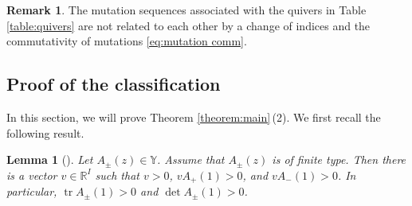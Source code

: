 \documentclass[pdftex]{sigma}
\numberwithin{equation}{section}
\newtheorem{Lemma}[Theorem]{Lemma}
\theoremstyle{definition}
\newtheorem{Remark}[Theorem]{Remark}
\DeclareMathOperator{\tr}{tr}
\begin{document}
\begin{Remark}\label{remark:quiver is different}
 The mutation sequences associated with the quivers in Table \ref{table:quivers}
 are not related to each other by
 a change of indices and the commutativity of mutations \eqref{eq:mutation comm}.
\end{Remark}

\subsection{Proof of the classification}
\label{section:proof of classification}
In this section, we will prove Theorem \ref{theorem:main}\,(2). We first recall the following result.
\begin{Lemma}[{\cite[Theorem 5.5]{mizuno2020difference}}]
 \label{lemma:simultaneous positive}
 Let $A_\pm(z) \in \mathbb{Y}$. Assume that $A_\pm(z)$ is of finite type.
 Then there is a vector $v \in \mathbb{R}^I$ such that $v > 0$,
 $v A_+(1) > 0$, and $v A_-(1) > 0$.
 In particular, $\tr A_\pm (1) >0$ and $\det A_\pm (1) > 0$.
\end{Lemma}
\end{document}
